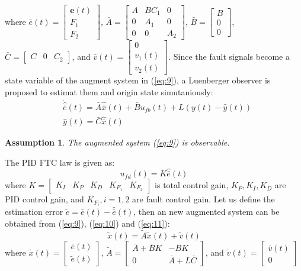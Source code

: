 \documentclass{ieeeaccess}
\newtheorem{assumption}{Assumption}[section]
\begin{document}
where $\bar{e}(t) = \begin{bmatrix}
    \pmb{e}(t) \\ F_1 \\ F_2
\end{bmatrix}$, $\bar{A}=\begin{bmatrix}
    A & BC_1 & 0 \\
    0 & A_1 & 0 \\
    0 & 0 & A_2
\end{bmatrix}$, $\bar{B}=\begin{bmatrix}
    B \\ 0 \\ 0
\end{bmatrix}$, $\bar{C}=\begin{bmatrix}
    C & 0 & C_2
\end{bmatrix}$, and $\bar{v}(t)=\begin{bmatrix}
    0 \\ v_1(t) \\ v_2(t)
\end{bmatrix}$. Since the fault signals become a state variable of the augment system in (\ref{eq:9}), a Luenberger observer is proposed to estimat them and origin state simutaniously:
\begin{equation} \label{eq:10}
    \begin{split}
        & \dot{\hat{\bar{e}}}(t)=\bar{A}\hat{\bar{x}}(t)+\bar{B}u_{fb}(t)+{L}(y(t)-\hat{y}(t)) \\
        & \hat{y}(t)=\bar{C}\hat{\bar{x}}(t)  
    \end{split}
\end{equation}
\begin{assumption}
    The augmented system (\ref{eq:9}) is observable.
\end{assumption}
The PID FTC law is given as:
\begin{equation} \label{eq:11}
    u_{fd}(t)=K\hat{\bar{e}}(t)
\end{equation}
where $K = \begin{bmatrix}
    K_I & K_P & K_D & K_{F_1} & K_{F_2}
\end{bmatrix}$ is total control gain, $K_P,K_I,K_D$ are PID control gain, and $K_{F_i}, i=1,2$ are fault control gain. Let us define the estimation error $\tilde{e}=\bar{e}(t)-\hat{\bar{e}}(t)$, then an new augmented system can be obtained from (\ref{eq:9}), (\ref{eq:10}) and (\ref{eq:11}):
\begin{equation} \label{eq:aug}
    \dot{\tilde{x}}(t) = \tilde{A}\tilde{x}(t)+\tilde{v}(t)
\end{equation}
where $\tilde{x}(t)=\begin{bmatrix}
    \bar{e}(t) \\ \tilde{e}(t)
\end{bmatrix}$, $\tilde{A}=\begin{bmatrix}
    \bar{A}+\bar{B}K & -\bar{B}K \\ 0 & \bar{A}+L\bar{C}
\end{bmatrix}$, and $\tilde{v}(t)=\begin{bmatrix}
    \bar{v}(t) \\ 0
\end{bmatrix}$
\end{document}
